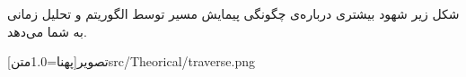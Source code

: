 شکل زیر شهود بیشتری درباره‌ی چگونگی پیمایش مسیر توسط الگوریتم و تحلیل زمانی به شما می‌دهد.

\begin{center}
‌تصویر[پهنا=1.0‌متن]{src/Theorical/traverse.png}
\end{center}


 













